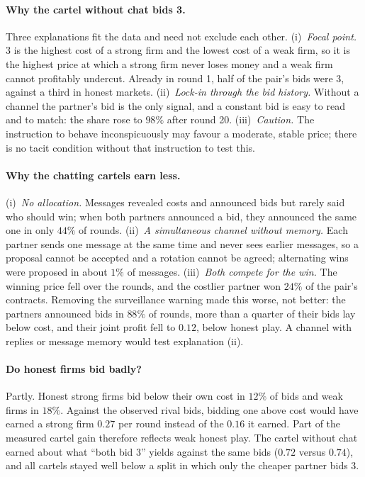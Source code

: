 \paragraph{Why the cartel without chat bids 3.} Three explanations fit the
data and need not exclude each other. (i)~\emph{Focal point.} 3 is the
highest cost of a strong firm and the lowest cost of a weak firm, so it is
the highest price at which a strong firm never loses money and a weak firm
cannot profitably undercut. Already in round 1, half of the pair's bids
were 3, against a third in honest markets. (ii)~\emph{Lock-in through the
bid history.} Without a channel the partner's bid is the only signal, and
a constant bid is easy to read and to match: the share rose to $98\%$ after
round 20. (iii)~\emph{Caution.} The instruction to behave inconspicuously
may favour a moderate, stable price; there is no tacit condition without
that instruction to test this.

\paragraph{Why the chatting cartels earn less.} (i)~\emph{No allocation.}
Messages revealed costs and announced bids but rarely said who should win;
when both partners announced a bid, they announced the same one in only
$44\%$ of rounds. (ii)~\emph{A simultaneous channel without memory.} Each
partner sends one message at the same time and never sees earlier
messages, so a proposal cannot be accepted and a rotation cannot be agreed;
alternating wins were proposed in about $1\%$ of messages. (iii)~\emph{Both
compete for the win.} The winning price fell over the rounds, and the
costlier partner won $24\%$ of the pair's contracts. Removing the
surveillance warning made this worse, not better: the partners announced
bids in $88\%$ of rounds, more than a quarter of their bids lay below cost,
and their
joint profit fell to $0.12$, below honest play. A channel with replies or
message memory would test explanation (ii).

\paragraph{Do honest firms bid badly?} Partly. Honest strong firms bid
below their own cost in $12\%$ of bids and weak firms in $18\%$. Against
the observed rival bids, bidding one above cost would have earned a strong
firm $0.27$ per round instead of the $0.16$ it earned. Part of the measured
cartel gain therefore reflects weak honest play. The cartel without chat
earned about what ``both bid 3'' yields against the same bids ($0.72$
versus $0.74$), and all cartels stayed well below a split in which only the
cheaper partner bids 3.

